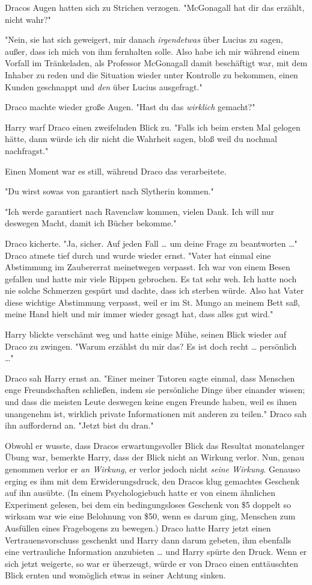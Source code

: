 {Dracos Augen hatten sich zu Strichen verzogen. "McGonagall hat dir das erzählt, nicht wahr?"

"Nein, sie hat sich geweigert, mir danach \emph{irgendetwas} über Lucius zu sagen, außer, dass ich mich von ihm fernhalten solle. Also habe ich mir während einem Vorfall im Tränkeladen, als Professor McGonagall damit beschäftigt war, mit dem Inhaber zu reden und die Situation wieder unter Kontrolle zu bekommen, einen Kunden geschnappt und \emph{den} über Lucius ausgefragt."

Draco machte wieder große Augen. "Hast du das \emph{wirklich} gemacht?"

Harry warf Draco einen zweifelnden Blick zu. "Falls ich beim ersten Mal gelogen hätte, dann würde ich dir nicht die Wahrheit sagen, bloß weil du nochmal nachfragst."

Einen Moment war es still, während Draco das verarbeitete.

"Du wirst sowas von garantiert nach Slytherin kommen."

"Ich werde garantiert nach Ravenclaw kommen, vielen Dank. Ich will nur deswegen Macht, damit ich Bücher bekomme."

Draco kicherte. "Ja, sicher. Auf jeden Fall … um deine Frage zu beantworten …" Draco atmete tief durch und wurde wieder ernst. "Vater hat einmal eine Abstimmung im Zaubererrat meinetwegen verpasst. Ich war von einem Besen gefallen und hatte mir viele Rippen gebrochen. Es tat sehr weh. Ich hatte noch nie solche Schmerzen gespürt und dachte, dass ich sterben würde. Also hat Vater diese wichtige Abstimmung verpasst, weil er im St. Mungo an meinem Bett saß, meine Hand hielt und mir immer wieder gesagt hat, dass alles gut wird."

Harry blickte verschämt weg und hatte einige Mühe, seinen Blick wieder auf Draco zu zwingen. "Warum erzählst du mir das? Es ist doch recht … persönlich …"

Draco sah Harry ernst an. "Einer meiner Tutoren sagte einmal, dass Menschen enge Freundschaften schließen, indem sie persönliche Dinge über einander wissen; und dass die meisten Leute deswegen keine engen Freunde haben, weil es ihnen unangenehm ist, wirklich private Informationen mit anderen zu teilen." Draco sah ihn auffordernd an. "Jetzt bist du dran."

Obwohl er wusste, dass Dracos erwartungsvoller Blick das Resultat monatelanger Übung war, bemerkte Harry, dass der Blick nicht an Wirkung verlor. Nun, genau genommen verlor er \emph{an Wirkung}, er verlor jedoch nicht \emph{seine Wirkung}. Genauso erging es ihm mit dem Erwiderungsdruck, den Dracos klug gemachtes Geschenk auf ihn ausübte. (In einem Psychologiebuch hatte er von einem ähnlichen Experiment gelesen, bei dem ein bedingungsloses Geschenk von \$5 doppelt so wirksam war wie eine Belohnung von \$50, wenn es darum ging, Menschen zum Ausfüllen eines Fragebogens zu bewegen.) Draco hatte Harry jetzt einen Vertrauensvorschuss geschenkt und Harry dann darum gebeten, ihm ebenfalls eine vertrauliche Information anzubieten … und Harry spürte den Druck. Wenn er sich jetzt weigerte, so war er überzeugt, würde er von Draco einen enttäuschten Blick ernten und womöglich etwas in seiner Achtung sinken.

}
